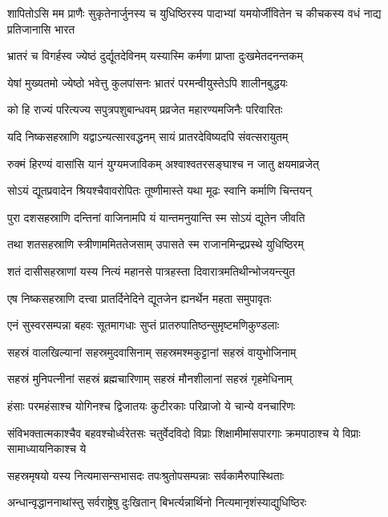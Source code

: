 \threelineshloka
{शापितोऽसि मम प्राणैः सुकृतेनार्जुनस्य च}
{युधिष्ठिरस्य पादाभ्यां यमयोर्जीवितेन च}
{कीचकस्य वधं नाद्य प्रतिजानासि भारत}


\twolineshloka
{भ्रातरं च विगर्हस्व ज्येष्ठं दुर्द्यूतदेविनम्}
{यस्यास्मि कर्मणा प्राप्ता दुःखमेतदनन्तकम्}


\twolineshloka
{येषां मुख्यतमो ज्येष्ठो भवेत्तु कुलपांसनः}
{भ्रातरं परमन्वीयुस्तेऽपि शालीनबुद्धयः}


\twolineshloka
{को हि राज्यं परित्यज्य सपुत्रपशुबान्धवम्}
{प्रव्रजेत महारण्यमजिनैः परिवारितः}


\twolineshloka
{यदि निष्कसहस्राणि यद्वाऽन्यत्सारवद्धनम्}
{सायं प्रातरदेविष्यदपि संवत्सरायुतम्}


\twolineshloka
{रुक्मं हिरण्यं वासांसि यानं युग्यमजाविकम्}
{अश्वाश्वतरसङ्घाश्च न जातु क्षयमाव्रजेत्}


\twolineshloka
{सोऽयं द्यूतप्रवादेन श्रियश्चैवावरोपितः}
{तूष्णीमास्ते यथा मूढः स्वानि कर्माणि चिन्तयन्}


\twolineshloka
{पुरा दशसहस्राणि दन्तिनां वाजिनामपि}
{यं यान्तमनुयान्ति स्म सोऽयं द्यूतेन जीवति}


\twolineshloka
{तथा शतसहस्राणि स्त्रीणाममिततेजसाम्}
{उपासते स्म राजानमिन्द्रप्रस्थे युधिष्ठिरम्}


\twolineshloka
{शतं दासीसहस्राणां यस्य नित्यं महानसे}
{पात्रहस्ता दिवारात्रमतिथीन्भोजयन्त्युत}


\twolineshloka
{एष निष्कसहस्राणि दत्त्वा प्रातर्दिनेदिने}
{द्यूतजेन ह्यनर्थेन महता समुपावृतः}


\twolineshloka
{एनं सुस्वरसम्पन्ना बहवः सूतमागधाः}
{सुप्तं प्रातरुपातिष्ठन्सुमृष्टमणिकुण्डलाः}


\twolineshloka
{सहस्रं वालखिल्यानां सहस्रमुदवासिनाम्}
{सहस्रमश्मकुट्टानां सहस्रं वायुभोजिनाम्}


\twolineshloka
{सहस्रं मुनिपत्नीनां सहस्रं ब्रह्मचारिणाम्}
{सहस्रं मौनशीलानां सहस्रं गृहमेधिनाम्}


\twolineshloka
{हंसाः परमहंसाश्च योगिनश्च द्विजातयः}
{कुटीरकाः परिव्राजो ये चान्ये वनचारिणः}


\threelineshloka
{संविभक्तात्मकाश्चैव बहवश्चोर्ध्वरेतसः}
{चतुर्वेदविदो विप्राः शिक्षामीमांसपारगाः}
{क्रमपाठाश्च ये विप्राः सामाध्यायनिकाश्च ये}


\twolineshloka
{सहस्रमृषयो यस्य नित्यमासन्सभासदः}
{तपःश्रुतोपसम्पन्नाः सर्वकामैरुपास्थिताः}


\twolineshloka
{अन्धान्वृद्धाननाथांस्तु सर्वराष्ट्रेषु दुःखितान्}
{बिभर्त्यन्नार्थिनो नित्यमानृशंस्याद्युधिष्ठिरः}


